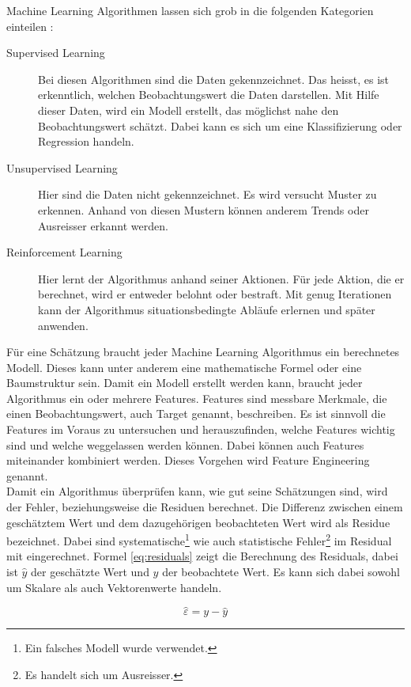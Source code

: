 \begin{samepage}
Machine Learning Algorithmen lassen sich grob in die folgenden Kategorien einteilen \cite{super_unsuper}:
\begin{description}
  \item[Supervised Learning]	Bei diesen Algorithmen sind die Daten gekennzeichnet. Das heisst, es ist erkenntlich, welchen Beobachtungswert die Daten darstellen. Mit Hilfe dieser Daten, wird ein Modell erstellt, das möglichst nahe den Beobachtungswert schätzt. Dabei kann es sich um eine Klassifizierung oder Regression handeln.
  \item[Unsupervised Learning] Hier sind die Daten nicht gekennzeichnet. Es wird versucht Muster zu erkennen. Anhand von diesen Mustern können anderem Trends oder Ausreisser erkannt werden.
  \item[Reinforcement Learning] Hier lernt der Algorithmus anhand seiner Aktionen. Für jede Aktion, die er berechnet, wird er entweder belohnt oder bestraft. Mit genug Iterationen kann der Algorithmus situationsbedingte Abläufe erlernen und später anwenden.
\end{description}
\end{samepage}

Für eine Schätzung braucht jeder Machine Learning Algorithmus ein berechnetes Modell. Dieses kann unter anderem eine mathematische Formel oder eine Baumstruktur sein. Damit ein Modell erstellt werden kann, braucht jeder Algorithmus ein oder mehrere Features. Features sind messbare Merkmale, die einen Beobachtungswert, auch Target genannt, beschreiben. Es ist sinnvoll die Features im Voraus zu untersuchen und herauszufinden, welche Features wichtig sind und welche weggelassen werden können. Dabei können auch Features miteinander kombiniert werden. Dieses Vorgehen wird Feature Engineering genannt.\\[2ex]
%
Damit ein Algorithmus überprüfen kann, wie gut seine Schätzungen sind, wird der Fehler, beziehungsweise die Residuen berechnet. Die Differenz zwischen einem geschätztem Wert und dem dazugehörigen beobachteten Wert wird als Residue bezeichnet. Dabei sind systematische\footnote{Ein falsches Modell wurde verwendet.} wie auch statistische Fehler\footnote{Es handelt sich um Ausreisser.} im Residual mit  eingerechnet. Formel \eqref{eq:residuals} zeigt die Berechnung des Residuals, dabei ist $\hat{y}$ der geschätzte Wert und $y$ der beobachtete Wert. Es kann sich dabei sowohl um Skalare als auch Vektorenwerte handeln.

\begin{equation}
\label{eq:residuals}
\hat{\varepsilon} = y - \hat{y}
\end{equation}

